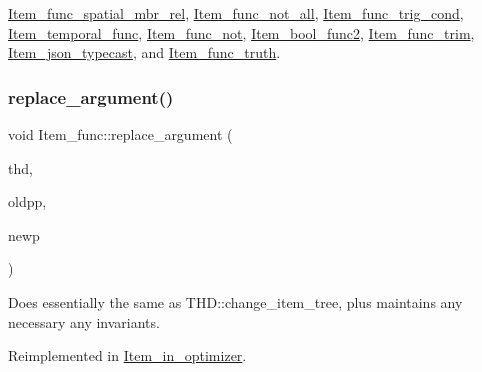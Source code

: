 \mbox{\hyperlink{classItem__func__spatial__mbr__rel_a0f37964f2e40c8cf415dd81f03795c35}{Item\+\_\+func\+\_\+spatial\+\_\+mbr\+\_\+rel}}, \mbox{\hyperlink{classItem__func__not__all_add67ca3249a9c4b6b68e6a6d0fcdd411}{Item\+\_\+func\+\_\+not\+\_\+all}}, \mbox{\hyperlink{classItem__func__trig__cond_afa6900d80f97abb71f1e710c02d83d8a}{Item\+\_\+func\+\_\+trig\+\_\+cond}}, \mbox{\hyperlink{classItem__temporal__func_a2d5c593d44864f0d0744dd6c6a00f6ac}{Item\+\_\+temporal\+\_\+func}}, \mbox{\hyperlink{classItem__func__not_a2d11d511c9b23933c2615f703b6e38fa}{Item\+\_\+func\+\_\+not}}, \mbox{\hyperlink{classItem__bool__func2_a12469a240720c26bef325a4ee5b02f50}{Item\+\_\+bool\+\_\+func2}}, \mbox{\hyperlink{classItem__func__trim_a1a6186bb6a876ebfa09ee9c600c0bdfd}{Item\+\_\+func\+\_\+trim}}, \mbox{\hyperlink{classItem__json__typecast_a94def4699135226915f3350f5cb6dde7}{Item\+\_\+json\+\_\+typecast}}, and \mbox{\hyperlink{classItem__func__truth_aa17f138c8366c33e377d3e64384415c1}{Item\+\_\+func\+\_\+truth}}.

\mbox{\label{classItem__func_a057cee4e4645ad681094796d24236b62}} 
\subsubsection{\texorpdfstring{replace\+\_\+argument()}{replace\_argument()}}
{\footnotesize\ttfamily void Item\+\_\+func\+::replace\+\_\+argument (\begin{DoxyParamCaption}\item[{T\+HD $\ast$}]{thd,  }\item[{\mbox{\hyperlink{classItem}{Item}} $\ast$$\ast$}]{oldpp,  }\item[{\mbox{\hyperlink{classItem}{Item}} $\ast$}]{newp }\end{DoxyParamCaption})\hspace{0.3cm}{\ttfamily [virtual]}}

Does essentially the same as T\+H\+D\+::change\+\_\+item\+\_\+tree, plus maintains any necessary any invariants. 

Reimplemented in \mbox{\hyperlink{classItem__in__optimizer_a84811ad5fbb554956debfc5acf07faa7}{Item\+\_\+in\+\_\+optimizer}}.

\mbox{\label{classItem__func_a8c4c3f65de6a0cc3c4d49720572c55ee}} 
